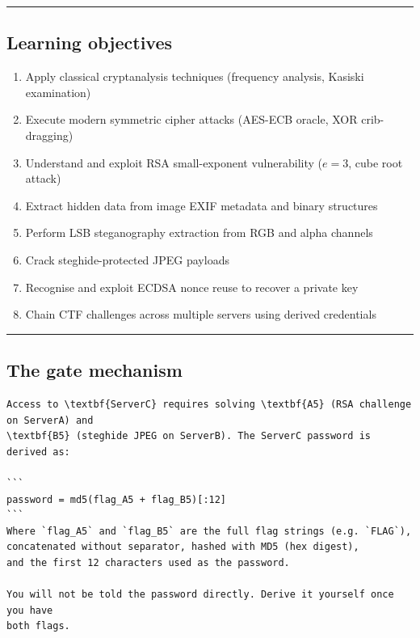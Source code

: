 \begin{center}\rule{0.5\linewidth}{0.5pt}\end{center}

\subsection{Learning objectives}

\begin{enumerate}
\def\labelenumi{\arabic{enumi}.}
\tightlist
\item
  Apply classical cryptanalysis techniques (frequency analysis, Kasiski examination)
\item
  Execute modern symmetric cipher attacks (AES-ECB oracle, XOR crib-dragging)
\item
  Understand and exploit RSA small-exponent vulnerability (\(e=3\), cube root attack)
\item
  Extract hidden data from image EXIF metadata and binary structures
\item
  Perform LSB steganography extraction from RGB and alpha channels
\item
  Crack steghide-protected JPEG payloads
\item
  Recognise and exploit ECDSA nonce reuse to recover a private key
\item
  Chain CTF challenges across multiple servers using derived credentials
\end{enumerate}

\begin{center}\rule{0.5\linewidth}{0.5pt}\end{center}

\subsection{The gate mechanism}

\begin{lstlisting}
Access to \textbf{ServerC} requires solving \textbf{A5} (RSA challenge on ServerA) and
\textbf{B5} (steghide JPEG on ServerB). The ServerC password is derived as:

```
password = md5(flag_A5 + flag_B5)[:12]
```
Where `flag_A5` and `flag_B5` are the full flag strings (e.g. `FLAG`),
concatenated without separator, hashed with MD5 (hex digest),
and the first 12 characters used as the password.

You will not be told the password directly. Derive it yourself once you have
both flags.
\end{lstlisting}

